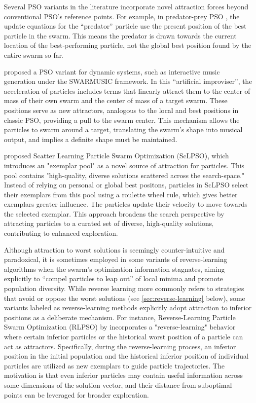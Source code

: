 {Several PSO variants in the literature incorporate novel attraction forces beyond conventional PSO's reference points.
For example, in predator-prey PSO \citep{silva2002empirical}, the update equations for the ``predator'' particle use the present position of the best particle in the swarm. This means the predator is drawn towards the current location of the best-performing particle, not the global best position found by the entire swarm so far.

\citet{blackwell2002collision} proposed a PSO variant for dynamic systems, such as interactive music generation under the SWARMUSIC framework. In this ``artificial improviser'', the acceleration of particles includes terms that linearly attract them to the center of mass of their own swarm and the center of mass of a target swarm. These positions serve as new attractors, analogous to the local and best positions in classic PSO, providing a pull to the swarm center. This mechanism allows the particles to swarm around a target, translating the swarm's shape into musical output, and implies a definite shape must be maintained.

\citet{ren2014scatterlearning} proposed Scatter Learning Particle Swarm Optimization (ScLPSO), which introduces an "exemplar pool" as a novel source of attraction for particles. This pool contains "high-quality, diverse solutions scattered across the \gls{search-space}." Instead of relying on personal or global best positons, particles in ScLPSO select their exemplars from this pool using a roulette wheel rule, which gives better exemplars greater influence. The particles update their velocity to move towards the selected exemplar. This approach broadens the search perspective by attracting particles to a curated set of diverse, high-quality solutions, contributing to enhanced exploration.

Although attraction to worst solutions is seemingly counter-intuitive and paradoxical, it is sometimes employed in some variants of reverse-learning algorithms when the swarm's optimization information stagnates, aiming explicitly to ``compel particles to leap out'' of local minima and promote population diversity.  While reverse learning more commonly refers to strategies that avoid or oppose the worst solutions (see \autoref{sec:reverse-learning} below), some variants labeled as reverse-learning methods explicitly adopt attraction to inferior positions as a deliberate mechanism.
For instance, Reverse-Learning Particle Swarm Optimization (RLPSO)  by \citet{xia2014reverselearning} incorporates a "reverse-learning" behavior where certain inferior particles or the historical worst position of a particle can act as attractors. Specifically, during the reverse-learning process, an inferior position in the initial population and the historical inferior position of individual particles are utilized as new exemplars to guide particle trajectories. The motivation is that even inferior particles may contain useful information across some dimensions of the solution vector, and their distance from suboptimal points can be leveraged for broader exploration.

}

